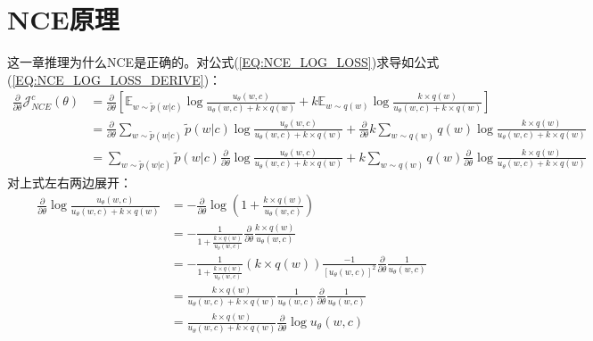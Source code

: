 \documentclass{article}
\begin{document}
\section{NCE原理}
这一章推理为什么NCE是正确的。对公式(\ref{EQ:NCE_LOG_LOSS})求导如公式(\ref{EQ:NCE_LOG_LOSS_DERIVE})：
\begin{equation}
    \begin{split}
        \frac{\partial}{\partial \theta} \mathcal{J}_{NCE}^{c}(\theta) &= \frac{\partial}{\partial \theta} [\mathbb{E}_{w \sim \tilde{p}(w|c)} \log \frac{u_\theta (w,c)}{u_\theta (w,c) + k \times q(w)} + k \mathbb{E}_{w \sim q(w)} \log \frac{k \times q(w)}{u_\theta (w,c) + k \times q(w)}] \\
        &= \frac{\partial}{\partial \theta} \sum_{w \sim \tilde{p}(w|c)} \tilde{p}(w|c) \log \frac{u_\theta (w,c)}{u_\theta (w,c) + k \times q(w)} + \frac{\partial}{\partial \theta} k \sum_{w \sim q(w)} q(w) \log \frac{k \times q(w)}{u_\theta (w,c) + k \times q(w)} \\
        &= \sum_{w \sim \tilde{p}(w|c)} \tilde{p}(w|c) \frac{\partial}{\partial \theta} \log \frac{u_\theta (w,c)}{u_\theta (w,c) + k \times q(w)} + k \sum_{w \sim q(w)} q(w) \frac{\partial}{\partial \theta} \log \frac{k \times q(w)}{u_\theta (w,c) + k \times q(w)}
    \end{split}
    \label{EQ:NCE_LOG_LOSS_DERIVE}
\end{equation}
对上式左右两边展开：
\begin{equation}
    \begin{split}
        \frac{\partial}{\partial \theta} \log \frac{u_\theta (w,c)}{u_\theta (w,c) + k \times q(w)} &= - \frac{\partial}{\partial \theta} \log (1 + \frac{k \times q(w)}{u_\theta (w,c)}) \\ 
        &= - \frac{1}{1 + \frac{k \times q(w)}{u_\theta (w,c)}} \frac{\partial}{\partial \theta} \frac{k \times q(w)}{u_\theta (w,c)} \\
        &= - \frac{1}{1 + \frac{k \times q(w)}{u_\theta (w,c)}} (k \times q(w)) \frac{-1}{[u_\theta (w,c)]^2} \frac{\partial}{\partial \theta} \frac{1}{u_\theta(w,c)} \\
        &= \frac{k \times q(w)}{u_\theta (w,c) + k \times q(w)} \frac{1}{u_\theta (w,c)} \frac{\partial}{\partial \theta} \frac{1}{u_\theta (w,c)} \\
        &= \frac{k \times q(w)}{u_\theta (w,c) + k \times q(w)} \frac{\partial}{\partial \theta} \log u_\theta(w,c)
    \end{split}
    \label{EQ:NCE_LOG_LOSS_DERIVE_LEFT}
\end{equation}
\end{document}
